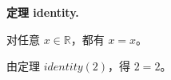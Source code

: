 \documentclass[11pt]{article}
\begin{document}
\par\noindent\textbf{定理 identity.}\par
\par\noindent 对任意 \(x\in \mathbb{R}\)，都有 \(x = x\)。

\par\noindent 由定理 \(\mathit{identity}(2)\)，得 \(2 = 2\)。
\end{document}
